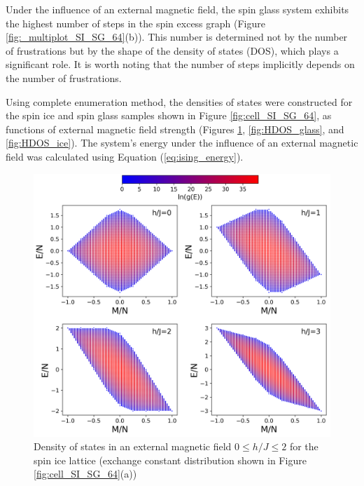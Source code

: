 \documentclass[utf8, babel, sor, jor, amsmath, amssymb, reprint]{elsarticle} %
\begin{document}
Under the influence of an external magnetic field, the spin glass system exhibits the highest number of steps in the spin excess graph (Figure \ref{fig:_multiplot_SI_SG_64}(b)).
This number is determined not by the number of frustrations but by the shape of the density of states (DOS), which plays a significant role.
It is worth noting that the number of steps implicitly depends on the number of frustrations.

Using complete enumeration method, the densities of states were constructed for the spin ice and spin glass samples shown in Figure \ref{fig:cell_SI_SG_64}, as functions of external magnetic field strength (Figures \ref{fig:HDOS_ice_1}, \ref{fig:HDOS_glass}, and \ref{fig:HDOS_ice}).
The system's energy under the influence of an external magnetic field was calculated using Equation (\ref{eq:ising_energy}).




\begin{figure}[H]
	\centering
	\includegraphics[width=1\linewidth]{pictures/HDOS_SI_64_J0_1.png}
	\caption{Density of states in an external magnetic field $0\leq h/J \leq 2$ for the spin ice lattice (exchange constant distribution shown in Figure \ref{fig:cell_SI_SG_64}(a))}
	\label{fig:HDOS_ice_1}
\end{figure}
\end{document}
